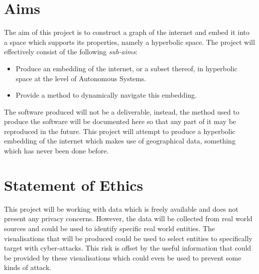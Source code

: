 \section{Aims}
\label{sec:aims}

The aim of this project is to construct a graph of the internet and embed it into a space which supports its properties, namely a hyperbolic space. The project will effectively consist of the following \textit{sub-aims}:

\begin{itemize}
	\item{Produce an embedding of the internet, or a subset thereof, in hyperbolic space at the level of Autonomous Systems.}
	\item{Provide a method to dynamically navigate this embedding.}
\end{itemize}

The software produced will not be a deliverable, instead, the method used to produce the software will be documented here so that any part of it may be reproduced in the future. This project will attempt to produce a hyperbolic embedding of the internet which makes use of geographical data, something which has never been done before.

\section{Statement of Ethics}

This project will be working with data which is freely available and does not present any privacy concerns. However, the data will be collected from real world sources and could be used to identify specific real world entities. The visualisations that will be produced could be used to select entities to specifically target with cyber-attacks. This risk is offset by the useful information that could be provided by these visualisations which could even be used to prevent some kinds of attack.
